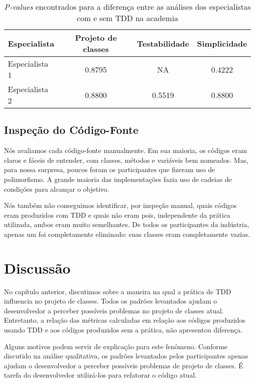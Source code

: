 \begin{table}[h!]
	\centering
	\begin{tabular}{| p{5cm} | c | c | c | }
		\hline
		Especialista & Projeto de classes & Testabilidade & Simplicidade\\
		\hline
		Especialista 1	& 0.8795 &	NA	& 0.4222\\
		Especialista 2	& 0.8800	& 0.5519 &	0.8800\\
		\hline
	\end{tabular}
	\caption{\textit{P-values} encontrados para a diferença entre as análises dos especialistas com e sem TDD na academia}
	\label{tab:especialistas-academia}
\end{table}

\subsection{Inspeção do Código-Fonte}

Nós avaliamos cada código-fonte manualmente.
Em sua maioria, os códigos eram claros e fáceis de entender,
com classes, métodos e variáveis bem nomeados.
Mas, para nossa surpresa,
poucos foram os participantes que fizeram uso de polimorfismo. A grande
maioria das implementações fazia uso de cadeias de condições para 
alcançar o objetivo.

Nós também não conseguimos identificar, por inspeção manual, quais códigos
eram produzidos com TDD e quais não eram pois, independente
da prática utilizada, ambos eram muito semelhantes.
De todos os participantes da indústria, apenas um foi completamente eliminado:
suas classes eram completamente vazias. 


\section{Discussão}

No capítulo anterior, discutimos sobre a maneira na qual a prática de TDD
influencia no projeto de classes. Todos os padrões levantados ajudam
o desenvolvedor a perceber possíveis problemas no projeto de classes atual.
Entretanto, a relação das métricas calculadas em relação aos códigos
produzidos usando TDD e aos códigos produzidos sem a prática,
não apresentou diferença.

Alguns motivos podem servir de explicação para este fenômeno. Conforme discutido na análise
qualitativa, os padrões levantados pelos
participantes apenas ajudam o desenvolvedor a perceber possíveis problemas
de projeto de classes. É tarefa do desenvolvedor utilizá-los para
refatorar o código atual. 

